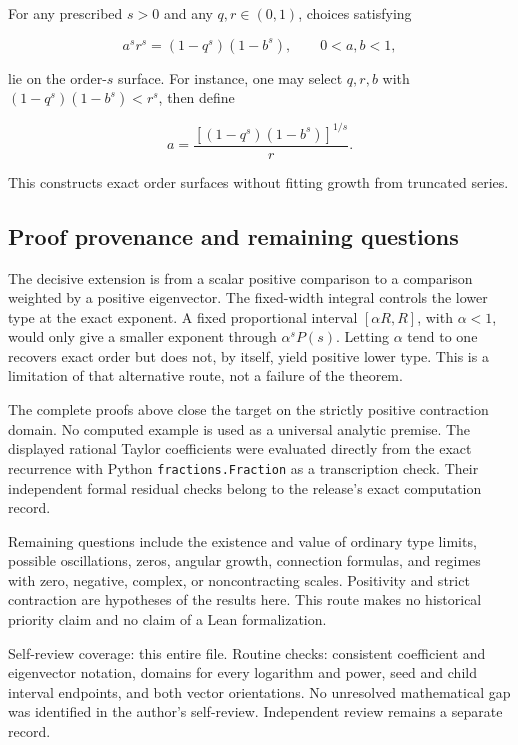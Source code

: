 For any prescribed \(s>0\) and any \(q,r\in(0,1)\), choices satisfying

\[
a^s r^s=(1-q^s)(1-b^s),\qquad 0<a,b<1,
\]

lie on the order-\(s\) surface. For instance, one may select \(q,r,b\)
with \((1-q^s)(1-b^s)<r^s\), then define

\[
a=\frac{[(1-q^s)(1-b^s)]^{1/s}}{r}.
\]

This constructs exact order surfaces without fitting growth from
truncated series.

\hypertarget{v11-coupled_growth_full-proof-provenance-and-remaining-questions}{%
\subsection{Proof provenance and remaining
questions}\label{v11-coupled_growth_full-proof-provenance-and-remaining-questions}}

The decisive extension is from a scalar positive comparison to a
comparison weighted by a positive eigenvector. The fixed-width integral
controls the lower type at the exact exponent. A fixed proportional
interval \([\alpha R,R]\), with \(\alpha<1\), would only give a smaller
exponent through \(\alpha^sP(s)\). Letting \(\alpha\) tend to one
recovers exact order but does not, by itself, yield positive lower type.
This is a limitation of that alternative route, not a failure of the
theorem.

The complete proofs above close the target on the strictly positive
contraction domain. No computed example is used as a universal analytic
premise. The displayed rational Taylor coefficients were evaluated
directly from the exact recurrence with Python
\texttt{fractions.Fraction} as a transcription check. Their independent
formal residual checks belong to the release's exact computation record.

Remaining questions include the existence and value of ordinary type
limits, possible oscillations, zeros, angular growth, connection
formulas, and regimes with zero, negative, complex, or noncontracting
scales. Positivity and strict contraction are hypotheses of the results
here. This route makes no historical priority claim and no claim of a
Lean formalization.

Self-review coverage: this entire file. Routine checks: consistent
coefficient and eigenvector notation, domains for every logarithm and
power, seed and child interval endpoints, and both vector orientations.
No unresolved mathematical gap was identified in the author's
self-review. Independent review remains a separate record.
